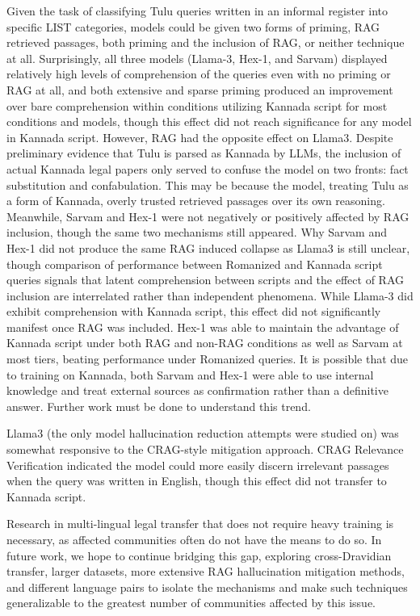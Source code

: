 \documentclass[11pt]{article}
\begin{document}
Given the task of classifying Tulu queries written in an informal register into specific LIST categories, models could be given two forms of priming, RAG retrieved passages, both priming and the inclusion of RAG, or neither technique at all. Surprisingly, all three models (Llama-3, Hex-1, and Sarvam) displayed relatively high levels of comprehension of the queries even with no priming or RAG at all, and both extensive and sparse priming produced an improvement over bare comprehension within conditions utilizing Kannada script for most conditions and models, though this effect did not reach significance for any model in Kannada script. However, RAG had the opposite effect on Llama3. Despite preliminary evidence that Tulu is parsed as Kannada by LLMs, the inclusion of actual Kannada legal papers only served to confuse the model on two fronts: fact substitution and confabulation. This may be because the model, treating Tulu as a form of Kannada, overly trusted retrieved passages over its own reasoning. Meanwhile, Sarvam and Hex-1 were not negatively or positively affected by RAG inclusion, though the same two mechanisms still appeared. Why Sarvam and Hex-1 did not produce the same RAG induced collapse as Llama3 is still unclear, though comparison of performance between Romanized and Kannada script queries signals that latent comprehension between scripts and the effect of RAG inclusion are interrelated rather than independent phenomena. While Llama-3 did exhibit comprehension with Kannada script, this effect did not significantly manifest once RAG was included.  Hex-1 was  able to maintain the advantage of Kannada script under both RAG and non-RAG conditions as well as Sarvam at most tiers, beating performance under Romanized queries. It is possible that due to training on Kannada, both Sarvam and Hex-1 were able to use internal knowledge and treat external sources as confirmation rather than a definitive answer. Further work must be done to understand this trend.

Llama3 (the only model hallucination reduction attempts were studied on) was somewhat responsive to the CRAG-style mitigation approach. CRAG Relevance Verification indicated the model could more easily discern irrelevant passages when the query was written in English, though this effect did not transfer to Kannada script. 

Research in multi-lingual legal transfer that does not require heavy training is necessary, as affected communities often do not have the means to do so. In future work, we hope to continue bridging this gap, exploring cross-Dravidian transfer, larger datasets, more extensive RAG hallucination mitigation methods, and different language pairs to isolate the mechanisms and make such techniques generalizable to the greatest number of communities affected by this issue. 
\end{document}
